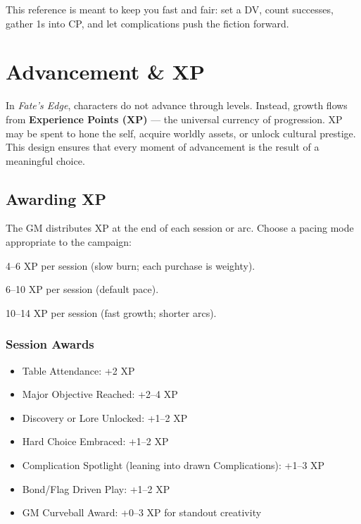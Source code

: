 \documentclass[12pt]{book}
\begin{document}
\bigskip
\noindent This reference is meant to keep you fast and fair: set a DV, count successes, gather 1s into CP, and let complications push the fiction forward.

\chapter{Advancement \& XP}

In \textit{Fate’s Edge}, characters do not advance through levels. 
Instead, growth flows from \textbf{Experience Points (XP)} --- the universal currency of progression. 
XP may be spent to hone the self, acquire worldly assets, or unlock cultural prestige. 
This design ensures that every moment of advancement is the result of a meaningful choice.

\section{Awarding XP}

The GM distributes XP at the end of each session or arc. 
Choose a pacing mode appropriate to the campaign:

\begin{description}[leftmargin=2cm]
  \item[Gritty:] 4--6 XP per session (slow burn; each purchase is weighty).  
  \item[Standard:] 6--10 XP per session (default pace).  
  \item[Heroic:] 10--14 XP per session (fast growth; shorter arcs).  
\end{description}

\subsection*{Session Awards}
\begin{itemize}
  \item Table Attendance: +2 XP  
  \item Major Objective Reached: +2--4 XP  
  \item Discovery or Lore Unlocked: +1--2 XP  
  \item Hard Choice Embraced: +1--2 XP  
  \item Complication Spotlight (leaning into drawn Complications): +1--3 XP  
  \item Bond/Flag Driven Play: +1--2 XP  
  \item GM Curveball Award: +0--3 XP for standout creativity  
\end{itemize}
\end{document}
